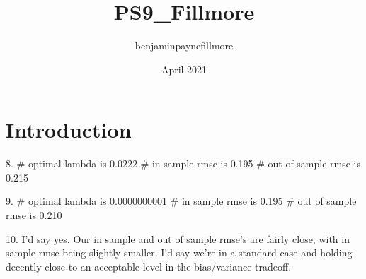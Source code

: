 \documentclass{article}
\title{PS9_Fillmore}
\author{benjaminpaynefillmore }
\date{April 2021}
\begin{document}
\maketitle

\section{Introduction}
8. 
# optimal lambda is 0.0222
# in sample rmse is 0.195
# out of sample rmse is 0.215

9. 
# optimal lambda is 0.0000000001
# in sample rmse is 0.195
# out of sample rmse is 0.210

10.
I'd say yes.
Our in sample and out of sample rmse's are fairly close, with in sample rmse being slightly smaller. I'd say we're in a standard case and holding decently close to an acceptable level in the bias/variance tradeoff.
\end{document}
